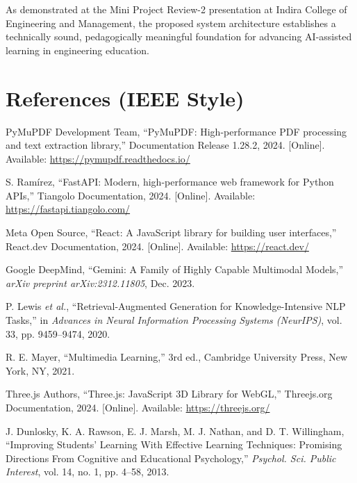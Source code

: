 \documentclass[11pt,a4paper]{report}
\begin{document}
As demonstrated at the Mini Project Review-2 presentation at Indira College of Engineering and Management, the proposed system architecture establishes a technically sound, pedagogically meaningful foundation for advancing AI-assisted learning in engineering education.

\section{References (IEEE Style)}
\begin{enumerate}[label={[\arabic*]}, topsep=2pt, itemsep=4pt]
    \item PyMuPDF Development Team, ``PyMuPDF: High-performance PDF processing and text extraction library,'' Documentation Release 1.28.2, 2024. [Online]. Available: \url{https://pymupdf.readthedocs.io/}
    \item S. Ram\'irez, ``FastAPI: Modern, high-performance web framework for Python APIs,'' Tiangolo Documentation, 2024. [Online]. Available: \url{https://fastapi.tiangolo.com/}
    \item Meta Open Source, ``React: A JavaScript library for building user interfaces,'' React.dev Documentation, 2024. [Online]. Available: \url{https://react.dev/}
    \item Google DeepMind, ``Gemini: A Family of Highly Capable Multimodal Models,'' \textit{arXiv preprint arXiv:2312.11805}, Dec. 2023.
    \item P. Lewis \textit{et al.}, ``Retrieval-Augmented Generation for Knowledge-Intensive NLP Tasks,'' in \textit{Advances in Neural Information Processing Systems (NeurIPS)}, vol. 33, pp. 9459--9474, 2020.
    \item R. E. Mayer, ``Multimedia Learning,'' 3rd ed., Cambridge University Press, New York, NY, 2021.
    \item Three.js Authors, ``Three.js: JavaScript 3D Library for WebGL,'' Threejs.org Documentation, 2024. [Online]. Available: \url{https://threejs.org/}
    \item J. Dunlosky, K. A. Rawson, E. J. Marsh, M. J. Nathan, and D. T. Willingham, ``Improving Students' Learning With Effective Learning Techniques: Promising Directions From Cognitive and Educational Psychology,'' \textit{Psychol. Sci. Public Interest}, vol. 14, no. 1, pp. 4--58, 2013.
\end{enumerate}
\clearpage

\end{document}
